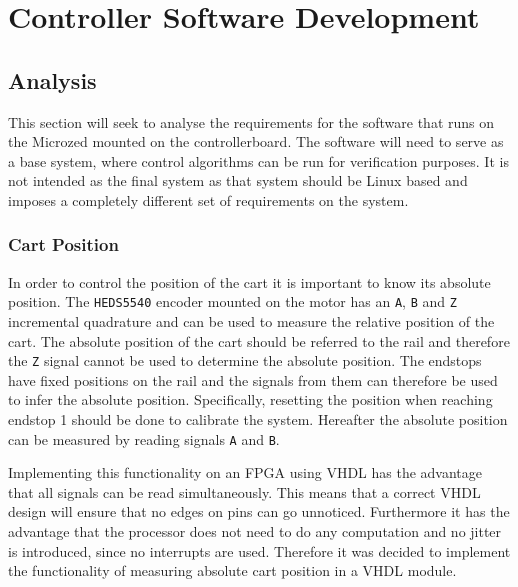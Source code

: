 \section{Controller Software Development} %
\label{sub:controller_board_software}

\subsection{Analysis} %
\label{sub:analysis}
This section will seek to analyse the requirements for the software that runs on the Microzed mounted on the controllerboard.
The software will need to serve as a base system, where control algorithms can be run for verification purposes.
It is not intended as the final system as that system should be Linux based and imposes a completely different set of requirements on the system.

\subsubsection{Cart Position} 
\label{ssub:cart_position}
In order to control the position of the cart it is important to know its absolute position.
The \texttt{HEDS5540} \cite{heds5540} encoder mounted on the motor has an \texttt{A}, \texttt{B} and \texttt{Z} incremental quadrature and can be used to measure the relative position of the cart. 
The absolute position of the cart should be referred to the rail and therefore the \texttt{Z} signal cannot be used to determine the absolute position.
The endstops have fixed positions on the rail and the signals from them can therefore be used to infer the absolute position.
Specifically, resetting the position when reaching endstop 1 should be done to calibrate the system.
Hereafter the absolute position can be measured by reading signals \texttt{A} and \texttt{B}.

Implementing this functionality on an FPGA using VHDL has the advantage that all signals can be read simultaneously.
This means that a correct VHDL design will ensure that no edges on pins can go unnoticed.
Furthermore it has the advantage that the processor does not need to do any computation and no jitter is introduced, since no interrupts are used. 
Therefore it was decided to implement the functionality of measuring absolute cart position in a VHDL module.


